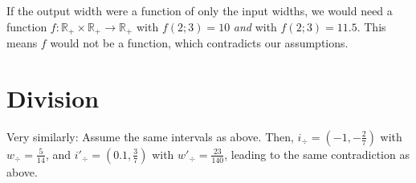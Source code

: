 \documentclass{../../sicp}
\begin{document}
If the output width were a function of only the input widths, we would need a function $f: \mathbb{R}_+ \times \mathbb{R}_+ \longrightarrow \mathbb{R}_+$ with $f(2; 3) = 10$ \emph{and} with $f(2; 3) = 11.5$.
This means $f$ would not be a function, which contradicts our assumptions.

\section*{Division}
Very similarly:
Assume the same intervals as above.
Then, $i_\div = (-1, -\frac{2}{7})$ with $w_\div = \frac{5}{14}$,
and $i'_\div = (0.1, \frac{3}{7})$ with $w'_\div = \frac{23}{140}$, leading to the same contradiction as above.
\end{document}
